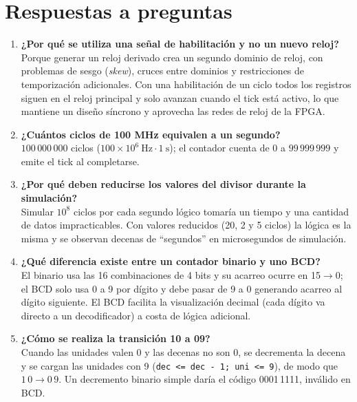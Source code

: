 \documentclass[letterpaper,12pt]{article}
\begin{document}
\section{Respuestas a preguntas}
\begin{enumerate}
    \item \textbf{¿Por qué se utiliza una señal de habilitación y no un nuevo reloj?}\\
    Porque generar un reloj derivado crea un segundo dominio de reloj, con problemas de sesgo (\textit{skew}), cruces entre dominios y restricciones de temporización adicionales. Con una habilitación de un ciclo todos los registros siguen en el reloj principal y solo avanzan cuando el tick está activo, lo que mantiene un diseño síncrono y aprovecha las redes de reloj de la FPGA.

    \item \textbf{¿Cuántos ciclos de 100 MHz equivalen a un segundo?}\\
    $100\,000\,000$ ciclos ($100\times10^{6}\ \mathrm{Hz}\cdot1\ \mathrm{s}$); el contador cuenta de 0 a $99\,999\,999$ y emite el tick al completarse.

    \item \textbf{¿Por qué deben reducirse los valores del divisor durante la simulación?}\\
    Simular $10^{8}$ ciclos por cada segundo lógico tomaría un tiempo y una cantidad de datos impracticables. Con valores reducidos (20, 2 y 5 ciclos) la lógica es la misma y se observan decenas de ``segundos'' en microsegundos de simulación.

    \item \textbf{¿Qué diferencia existe entre un contador binario y uno BCD?}\\
    El binario usa las 16 combinaciones de 4 bits y su acarreo ocurre en 15$\to$0; el BCD solo usa 0 a 9 por dígito y debe pasar de 9 a 0 generando acarreo al dígito siguiente. El BCD facilita la visualización decimal (cada dígito va directo a un decodificador) a costa de lógica adicional.

    \item \textbf{¿Cómo se realiza la transición 10 a 09?}\\
    Cuando las unidades valen 0 y las decenas no son 0, se decrementa la decena y se cargan las unidades con 9 (\texttt{dec <= dec - 1; uni <= 9}), de modo que $1\,0\rightarrow0\,9$. Un decremento binario simple daría el código 0001\,1111, inválido en BCD.


\end{enumerate}
\end{document}
